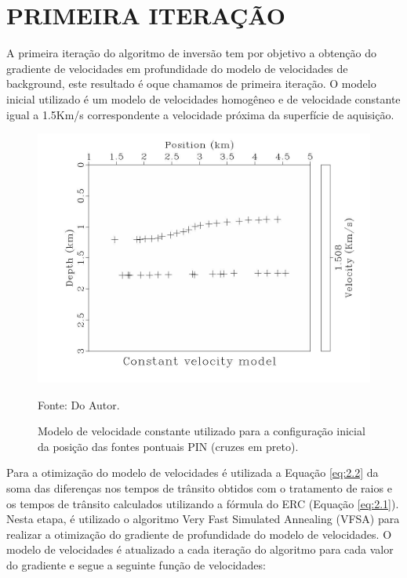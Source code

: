 \chapter{PRIMEIRA ITERAÇÃO}
\label{cap3}

A primeira iteração do algoritmo de inversão tem por objetivo a obtenção do gradiente de
velocidades em profundidade do modelo de velocidades de background, este resultado é oque
chamamos de primeira iteração. O modelo inicial utilizado é um modelo de velocidades homogêneo
e de velocidade constante igual a 1.5Km/s correspondente a velocidade próxima da superfície de aquisição. 

\begin{figure}[H]
\caption{Modelo de velocidade constante utilizado para a configuração inicial da
posição das fontes pontuais PIN (cruzes em preto).}
\begin{center}
\includegraphics[scale=0.3]{images/ctevel.jpeg}
\vspace{-0.3cm}
\end{center}
\begin{center}
 Fonte: Do Autor.
\end{center}
\label{fig:3.1}
\end{figure}


Para a otimização do modelo de velocidades é utilizada a Equação \ref{eq:2.2} da soma das
diferenças nos tempos de trânsito obtidos com o tratamento de raios e os tempos de trânsito calculados utilizando a fórmula do ERC (Equação \ref{eq:2.1}). Nesta etapa, é utilizado o algoritmo Very Fast Simulated Annealing (VFSA) para realizar a otimização do gradiente de profundidade do modelo de velocidades. O modelo de velocidades é atualizado a cada iteração do algoritmo para cada valor do gradiente e segue a seguinte função de velocidades:

